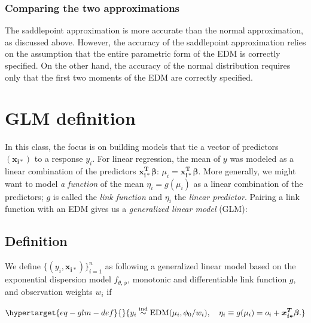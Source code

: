 \documentclass[
  11pt,
  letterpaper,
  oneside]{book}
\theoremstyle{definition}
\theoremstyle{plain}
\theoremstyle{plain}
\theoremstyle{plain}
\theoremstyle{remark}
\begin{document}
\hypertarget{comparing-the-two-approximations}{%
\subsection{Comparing the two
approximations}\label{comparing-the-two-approximations}}

The saddlepoint approximation is more accurate than the normal
approximation, as discussed above. However, the accuracy of the
saddlepoint approximation relies on the assumption that the entire
parametric form of the EDM is correctly specified. On the other hand,
the accuracy of the normal distribution requires only that the first two
moments of the EDM are correctly specified.

\hypertarget{sec-glm-def}{%
\chapter{GLM definition}\label{sec-glm-def}}

In this class, the focus is on building models that tie a vector of
predictors \((\boldsymbol{x_{i*}})\) to a response \(y_i\). For linear
regression, the mean of \(y\) was modeled as a linear combination of the
predictors \(\boldsymbol{x_{i*}^T} \boldsymbol{\beta}\):
\(\mu_i = \boldsymbol{x_{i*}^T} \boldsymbol{\beta}\). More generally, we
might want to model \emph{a function} of the mean \(\eta_i = g(\mu_i)\)
as a linear combination of the predictors; \(g\) is called the
\emph{link function} and \(\eta_i\) the \emph{linear predictor}. Pairing
a link function with an EDM gives us a \emph{generalized linear model}
(GLM):

\hypertarget{definition-1}{%
\section{Definition}\label{definition-1}}

We define \(\{(y_i, \boldsymbol{x_{i*}})\}_{i = 1}^n\) as following a
generalized linear model based on the exponential dispersion model
\(f_{\theta, \phi}\), monotonic and differentiable link function \(g\),
and observation weights \(w_i\) if

\begin{equation}\protect\hypertarget{eq-glm-def}{}{
y_i \overset{\text{ind}} \sim \text{EDM}(\mu_i, \phi_0/w_i), \quad \eta_i \equiv g(\mu_i) = o_i + \boldsymbol{x^T_{i*}}\boldsymbol{\beta}.
}\label{eq-glm-def}\end{equation}
\end{document}
